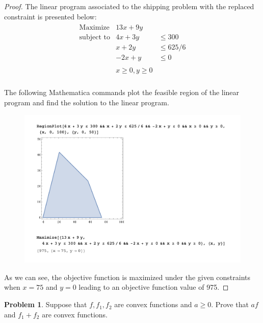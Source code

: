 \documentclass[12pt]{article}
\theoremstyle{definition}
\newtheorem{problem}{Problem}
\begin{document}
\begin{proof}
  The linear program associated to the shipping problem with the replaced constraint
  is presented below:
  \begin{align*}
    \begin{array} {lll}
      \text{Maximize} & 13x + 9y & \\
      \text{subject to} & 4x + 3y &\leq 300 \\
      & x + 2y &\leq 625/6\\
      & -2x + y &\leq 0 \\ \\
      & x \geq 0, y \geq 0 & \\
    \end{array}
  \end{align*}

  The following Mathematica commands plot the feasible region of the linear
  program and find the solution to the linear program.
  \begin{figure}[!h]
    \centerline{\includegraphics[scale=1.0]{linear_program}}
  \end{figure}

  As we can see, the objective function is maximized under the given constraints
  when $x = 75$ and $y = 0$ leading to an objective function value of 975.
\end{proof}
\newpage


\begin{problem}
  Suppose that $f, f_1, f_2$ are convex functions and $a \geq 0$. Prove that
  $af$ and $f_1 + f_2$ are convex functions.
\end{problem}
\end{document}
